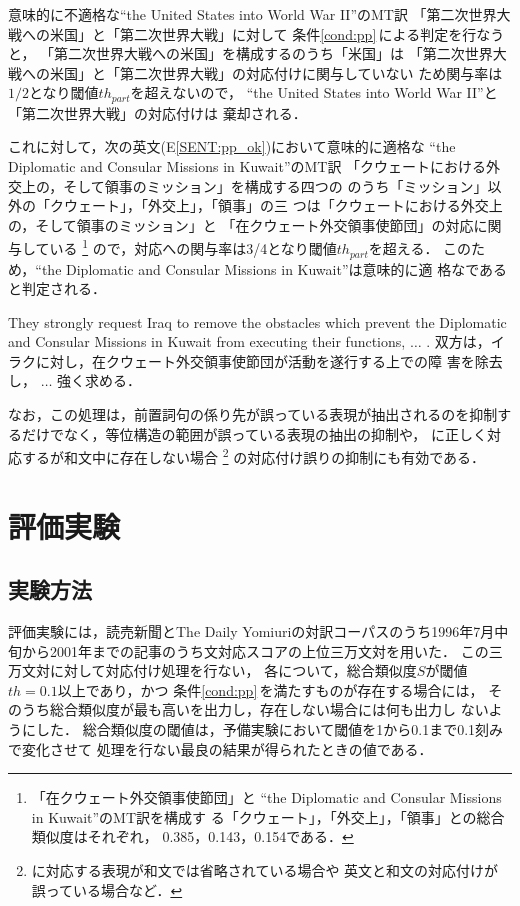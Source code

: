 意味的に不適格な{\CPNP}``the United States into World War II''のMT訳
「第二次世界大戦への米国」と{\JNP}「第二次世界大戦」に対して
条件\ref{cond:pp}\,による判定を行なうと，
「第二次世界大戦への米国」を構成する{\N}のうち「米国」は
「第二次世界大戦への米国」と「第二次世界大戦」の対応付けに関与していない
ため関与率は$1/2$となり閾値$th_{part}$を超えないので，
``the United States into World War II''と「第二次世界大戦」の対応付けは
棄却される．

これに対して，次の英文(E\ref{SENT:pp_ok})において意味的に適格な
{\CPNP}``the Diplomatic and Consular Missions in Kuwait''のMT訳
「クウェートにおける外交上の，そして領事のミッション」を構成する四つの
{\N}のうち「ミッション」以外の「クウェート」，「外交上」，「領事」の三
つは{\MTNP}「クウェートにおける外交上の，そして領事のミッション」と
{\JNP}「在クウェート外交領事使節団」の対応に関与している
\footnote{{\JNP}「在クウェート外交領事使節団」と
{\CPNP}``the Diplomatic and Consular Missions in Kuwait''のMT訳を構成す
る{\N}「クウェート」，「外交上」，「領事」との総合類似度はそれぞれ，
0.385，0.143，0.154である．}
ので，対応への関与率は3/4となり閾値$th_{part}$を超える．
このため，``the Diplomatic and Consular Missions in Kuwait''は意味的に適
格な{\CPNP}であると判定される．
\begin{SENT2}
\sentE
They strongly request Iraq to remove the obstacles which prevent the 
Diplomatic and Consular Missions in Kuwait from executing their 
functions, $\ldots$ .
\sentJ
双方は，イラクに対し，在クウェート外交領事使節団が活動を遂行する上での障
害を除去し， $\ldots$ 強く求める．
\label{SENT:pp_ok}
\end{SENT2}

なお，この処理は，前置詞句の係り先が誤っている表現が抽出されるのを抑制す
るだけでなく，等位構造の範囲が誤っている表現の抽出の抑制や，
{\CPNP}に正しく対応する{\JNP}が和文中に存在しない場合
\footnote{{\CPNP}に対応する表現が和文では省略されている場合や
英文と和文の対応付けが誤っている場合など．}
の対応付け誤りの抑制にも有効である．


\section{評価実験}
\label{sec:experiment}


\subsection{実験方法}
\label{sec:experiment:method}

評価実験には，読売新聞とThe Daily Yomiuriの対訳コーパスのうち1996年7月中
旬から2001年までの記事のうち文対応スコアの上位三万文対を用いた．
この三万文対に対して対応付け処理を行ない，
各{\CPNP}について，総合類似度$S$が閾値$th=0.1$以上であり，かつ
条件\ref{cond:pp}\,を満たすものが存在する場合には，
そのうち総合類似度が最も高い{\JNP}を出力し，存在しない場合には何も出力し
ないようにした．
総合類似度の閾値は，予備実験において閾値を1から0.1まで0.1刻みで変化させて
処理を行ない最良の結果が得られたときの値である．

